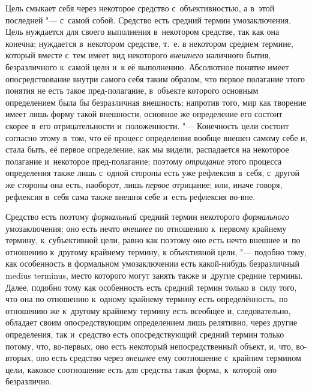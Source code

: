Цель смыкает себя через некоторое средство с~объективностью,
а в~этой последней "--- с~самой собой. Средство есть средний
термин умозаключения. Цель нуждается для своего выполнения в~некотором
средстве, так как она конечна; нуждается в~некотором средстве, т.~е. в
некотором среднем термине, который вместе с~тем имеет вид некоторого
{\em внешнего} наличного
бытия, безразличного к~самой цели и~к её выполнению. Абсолютное понятие
имеет опосредствование внутри самого себя таким образом, что первое
полагание этого понятия не есть такое пред-полагание, в~объекте
которого основным определением была бы безразличная внешность; напротив
того, мир как творение имеет лишь форму такой внешности, основное же
определение его состоит скорее в~его отрицательности и~положенности. "---
Конечность цели состоит согласно этому в~том, что её процесс
определения вообще внешен самому себе и, стала быть, её первое определение,
как мы видели, распадается на некоторое полагание и~некоторое
пред-полагание; поэтому {\em отрицание}
этого процесса определения также лишь с~одной стороны есть
уже рефлексия в~себя, с~другой же стороны она есть, наоборот, лишь
{\em первое} отрицание; или, иначе говоря, рефлексия в~себя сама также внешня
себе и~есть рефлексия во-вне.

Средство есть поэтому {\em формальный} средний термин некоторого
{\em формального} умозаключения; оно есть нечто {\em внешнее} по
отношению к~первому крайнему термину, к~субъективной цели, равно как
поэтому оно есть нечто внешнее и~по отношению к~другому крайнему термину, к
объективной цели, "--- подобно тому, как особенность в
формальном умозаключении есть какой-нибудь безразличный medius terminus,
место которого могут занять также и~другие средние термины.
Далее, подобно тому как особенность есть средний термин только в~силу того,
что она по отношению к~одному крайнему термину есть определённость, по
отношению же к~другому крайнему термину есть всеобщее и, следовательно,
обладает своим опосредствующим определением лишь релятивно, через другие
определения, так и~средство есть опосредствующий средний
термин только потому, что, во-первых, оно есть некоторый непосредственный
объект, и, что, во-вторых, оно есть средство через {\em внешнее} ему
соотношение с~крайним термином цели, каковое соотношение есть для средства
такая форма, к~которой оно безразлично.

